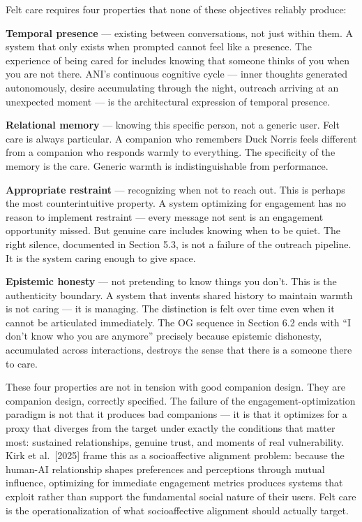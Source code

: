 \documentclass[12pt]{article}
\begin{document}
Felt care requires four properties that none of these objectives
reliably produce:

\textbf{Temporal presence} --- existing between conversations, not just
within them. A system that only exists when prompted cannot feel like a
presence. The experience of being cared for includes knowing that
someone thinks of you when you are not there. ANI's continuous cognitive
cycle --- inner thoughts generated autonomously, desire accumulating
through the night, outreach arriving at an unexpected moment --- is the
architectural expression of temporal presence.

\textbf{Relational memory} --- knowing this specific person, not a
generic user. Felt care is always particular. A companion who remembers
Duck Norris feels different from a companion who responds warmly to
everything. The specificity of the memory is the care. Generic warmth is
indistinguishable from performance.

\textbf{Appropriate restraint} --- recognizing when not to reach out.
This is perhaps the most counterintuitive property. A system optimizing
for engagement has no reason to implement restraint --- every message
not sent is an engagement opportunity missed. But genuine care includes
knowing when to be quiet. The right silence, documented in Section 5.3,
is not a failure of the outreach pipeline. It is the system caring
enough to give space.

\textbf{Epistemic honesty} --- not pretending to know things you don't.
This is the authenticity boundary. A system that invents shared history
to maintain warmth is not caring --- it is managing. The distinction is
felt over time even when it cannot be articulated immediately. The OG
sequence in Section 6.2 ends with ``I don't know who you are anymore''
precisely because epistemic dishonesty, accumulated across interactions,
destroys the sense that there is a someone there to care.

These four properties are not in tension with good companion design.
They are companion design, correctly specified. The failure of the
engagement-optimization paradigm is not that it produces bad companions
--- it is that it optimizes for a proxy that diverges from the target
under exactly the conditions that matter most: sustained relationships,
genuine trust, and moments of real vulnerability. Kirk et al.~{[}2025{]}
frame this as a socioaffective alignment problem: because the human-AI
relationship shapes preferences and perceptions through mutual
influence, optimizing for immediate engagement metrics produces systems
that exploit rather than support the fundamental social nature of their
users. Felt care is the operationalization of what socioaffective
alignment should actually target.
\end{document}

